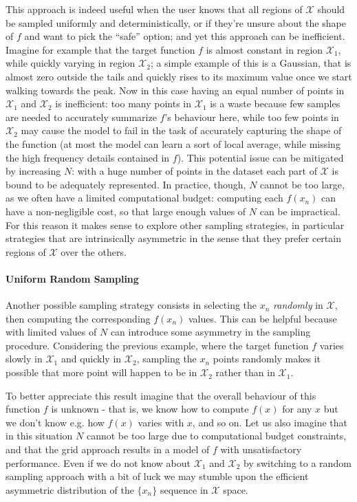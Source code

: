 This approach is indeed useful when the user knows that all regions of $\mathcal{X}$ should be sampled uniformly and deterministically, or if they're unsure about the shape of $f$ and want to pick the ``safe'' option; and yet this approach can be inefficient. Imagine for example that the target function $f$ is almost constant in region $\mathcal{X}_1$, while quickly varying in region $\mathcal{X}_2$; a simple example of this is a Gaussian, that is almost zero outside the tails and quickly rises to its maximum value once we start walking towards the peak. Now in this case having an equal number of points in $\mathcal{X}_1$ and $\mathcal{X}_2$ is inefficient: too many points in $\mathcal{X}_1$ is a waste because few samples are needed to accurately summarize $f$'s behaviour here, while too few points in $\mathcal{X}_2$ may cause the model to fail in the task of accurately capturing the shape of the function (at most the model can learn a sort of local average, while missing the high frequency details contained in $f$). This potential issue can be mitigated by increasing $N$: with a huge number of points in the dataset each part of $\mathcal{X}$ is bound to be adequately represented. In practice, though, $N$ cannot be too large, as we often have a limited computational budget: computing each $f(x_n)$ can have a non-negligible cost, so that large enough values of $N$ can be impractical. For this reason it makes sense to explore other sampling strategies, in particular strategies that are intrinsically asymmetric in the sense that they prefer certain regions of $\mathcal{X}$ over the others.

\paragraph{Uniform Random Sampling}
Another possible sampling strategy consists in selecting the $x_n$ \emph{randomly} in $\mathcal{X}$, then computing the corresponding $f(x_n)$ values. This can be helpful because with limited values of $N$ can introduce some asymmetry in the sampling procedure. Considering the previous example, where the target function $f$ varies slowly in $\mathcal{X}_1$ and quickly in $\mathcal{X}_2$, sampling the $x_n$ points randomly makes it possible that more point will happen to be in $\mathcal{X}_2$ rather than in $\mathcal{X}_1$. 

To better appreciate this result imagine that the overall behaviour of this function $f$ is unknown - that is, we know how to compute $f(x)$ for any $x$ but we don't know e.g. how $f(x)$ varies with $x$, and so on. Let us also imagine that in this situation $N$ cannot be too large due to computational budget constraints, and that the grid approach results in a model of $f$ with unsatisfactory performance. Even if we do not know about $\mathcal{X}_1$ and $\mathcal{X}_2$ by switching to a random sampling approach with a bit of luck we may stumble upon the efficient asymmetric distribution of the $\{x_n\}$ sequence in $\mathcal{X}$ space.

